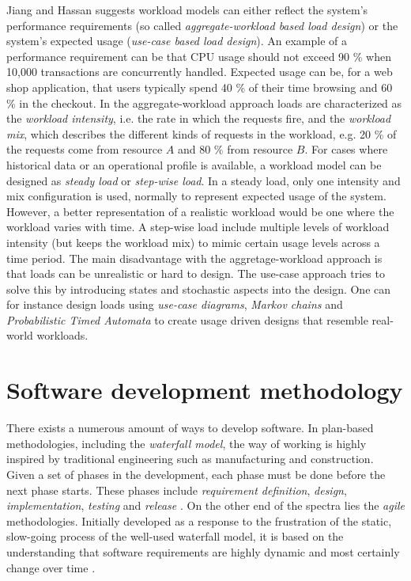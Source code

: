 Jiang and Hassan suggests workload models can either reflect the system's
performance requirements (so called \textit{aggregate-workload based load
design}) or the system's expected usage (\textit{use-case based load design}).
An example of a performance requirement can be that CPU usage should not exceed
90 \% when 10,000 transactions are concurrently handled. Expected usage can be,
for a web shop application, that users typically spend 40 \% of their time
browsing and 60 \% in the checkout. In the aggregate-workload approach loads
are characterized as the \textit{workload intensity}, i.e. the rate in which
the requests fire, and the \textit{workload mix}, which describes the different
kinds of requests in the workload, e.g. 20 \% of the requests come from
resource $A$ and 80 \% from resource $B$. For cases where historical data or an
operational profile is available, a workload model can be designed as
\textit{steady load} or \textit{step-wise load}. In a steady load, only one
intensity and mix configuration is used, normally to represent expected usage
of the system. However, a better representation of a realistic workload would
be one where the workload varies with time. A step-wise load include multiple
levels of workload intensity (but keeps the workload mix) to mimic certain
usage levels across a time period. The main disadvantage with the
aggretage-workload approach is that loads can be unrealistic or hard to design.
The use-case approach tries to solve this by introducing states and stochastic
aspects into the design. One can for instance design loads using \textit{use-case
diagrams}, \textit{Markov chains} and \textit{Probabilistic Timed Automata} to
create usage driven designs that resemble real-world workloads. \cite{jiang2015survey}


\section{Software development methodology}

There exists a numerous amount of ways to develop software. In plan-based
methodologies, including the \textit{waterfall model}, the way of working is
highly inspired by traditional engineering such as manufacturing and
construction. Given a set of phases in the development, each phase must be done
before the next phase starts. These phases include \textit{requirement
definition}, \textit{design}, \textit{implementation}, \textit{testing} and
\textit{release} \cite{crookshanks2014practical}. On the other end of the
spectra lies the \textit{agile} methodologies. Initially developed as a
response to the frustration of the static, slow-going process of the well-used
waterfall model, it is based on the understanding that software requirements
are highly dynamic and most certainly change over time
\cite{moniruzzaman2013comparative}.

